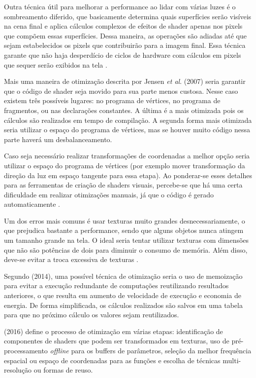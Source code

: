 Outra técnica útil para melhorar a performance ao lidar com várias luzes é o sombreamento diferido, que basicamente determina quais superfícies serão visíveis na cena final e aplica cálculos complexos de efeitos de shader apenas nos pixels que compõem essas superfícies. Dessa maneira, as operações são adiadas até que sejam estabelecidos os pixels que contribuirão para a imagem final. Essa técnica garante que não haja desperdício de ciclos de hardware com cálculos em pixels que sequer serão exibidos na tela \cite{GLSLBook}.

Mais uma maneira de otimização descrita por Jensen \textit{et al}. (2007) seria garantir que o código de shader seja movido para sua parte menos custosa. Nesse caso existem três possíveis lugares: no programa de vértices, no programa de fragmentos, ou nas declarações constantes. A última é a mais otimizada pois os cálculos são realizados em tempo de compilação. A segunda forma mais otimizada seria utilizar o espaço do programa de vértices, mas se houver muito código nessa parte haverá um desbalanceamento.

Caso seja necessário realizar transformações de coordenadas a melhor opção seria utilizar o espaço do programa de vértices (por exemplo mover transformação da direção da luz em espaço tangente para essa etapa). Ao ponderar-se esses detalhes para as ferramentas de criação de shaders visuais, percebe-se que há uma certa dificuldade em realizar otimizações manuais, já que o código é gerado automaticamente \cite{jensen2007shader}.

Um dos erros mais comuns é usar texturas muito grandes desnecessariamente, o que prejudica bastante a performance, sendo que alguns objetos nunca atingem um tamanho grande na tela. O ideal seria tentar utilizar texturas com dimensões que não são potências de dois para diminuir o consumo de memória. Além disso, deve-se evitar a troca excessiva de texturas \cite{riguer2002performance}.

Segundo  (2014), uma possível técnica de otimização seria o uso de memoização para evitar a execução redundante de computações reutilizando resultados anteriores, o que resulta em aumento de velocidade de execução e economia de energia. De forma simplificada, os cálculos realizados são salvos em uma tabela para que no próximo cálculo os valores sejam reutilizados.

 (2016) define o processo de otimização em várias etapas: identificação de componentes de shaders que podem ser transformados em texturas, uso de pré-processamento \textit{offline} para os buffers de parâmetros, seleção da melhor frequência espacial ou espaço de coordenadas para as funções e escolha de técnicas multi-resolução ou formas de reuso.

